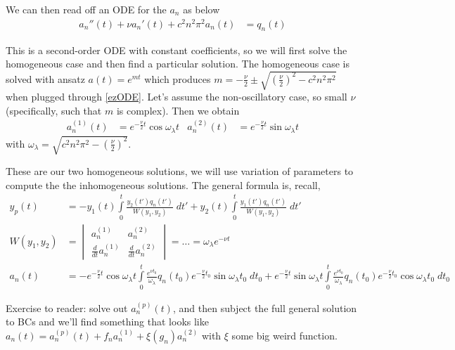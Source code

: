 \documentclass[10pt]{report}
\newcommand{\rd}[2]{\frac{d#1}{d#2}}
\begin{document}
We can then read off an ODE for the $a_n$ as below
\begin{align}
    a_n''(t) + \nu a_n'(t) + c^2n^2\pi^2a_n(t) &= q_n(t)\label{ezODE}
\end{align}

This is a second-order ODE with constant coefficients, so we will first solve the homogeneous case and then find a particular solution. The homogeneous case is solved with ansatz $a(t) = e^{mt}$ which produces $m = -\frac{\nu}{2}\pm \sqrt{\left( \frac{\nu}{2} \right)^2 - c^2n^2\pi^2}$ when plugged through \eqref{ezODE}. Let's assume the non-oscillatory case, so small $\nu$ (specifically, such that $m$ is complex). Then we obtain
\begin{align}
    a_n^{(1)}(t) &= e^{-\frac{\nu}{2}t}\cos \omega_\lambda t & a_n^{(2)}(t) &= e^{-\frac{\nu}{2}t}\sin \omega_\lambda t
\end{align}
with $\omega_\lambda = \sqrt{c^2n^2\pi^2 - \left( \frac{\nu}{2} \right)^2}$.

These are our two homogeneous solutions, we will use variation of parameters to compute the the inhomogeneous solutions. The general formula is, recall,
\begin{align}
    y_p(t) &= -y_1(t)\int\limits_{0}^{t}\frac{y_2(t')q_n(t')}{W(y_1, y_2)}\;dt' + y_2(t)\int\limits_{0}^{t}\frac{y_1(t')q_n(t')}{W(y_1,y_2)}\;dt'\\
    W(y_1,y_2) &= \begin{vmatrix} a_n^{(1)} & a_n^{(2)}\\ \rd{}{t}a_n^{(1)} & \rd{}{t}a_n^{(2)}\end{vmatrix} = \dots = \omega_\lambda e^{-\nu t}\\
    a_n(t) &= -e^{-\frac{\nu}{2}t}\cos \omega_\lambda t \int\limits_{0}^{t}\frac{e^{\nu t_0}}{\omega_\lambda}q_n(t_0)e^{-\frac{\nu}{2}t_0}\sin \omega_\lambda t_0\;dt_0 + e^{-\frac{\nu}{2}t}\sin \omega_\lambda t \int\limits_{0}^{t}\frac{e^{\nu t_0}}{\omega_\lambda}q_n(t_0)e^{-\frac{\nu}{2}t_0}\cos \omega_\lambda t_0\;dt_0
\end{align}

Exercise to reader: solve out $a_n^{(p)}(t)$, and then subject the full general solution to BCs and we'll find something that looks like $a_n(t) =a_n^{(p)}(t) + f_n a_n^{(1)} + \xi(g_n)a_n^{(2)}$ with $\xi$ some big weird function.
\end{document}
